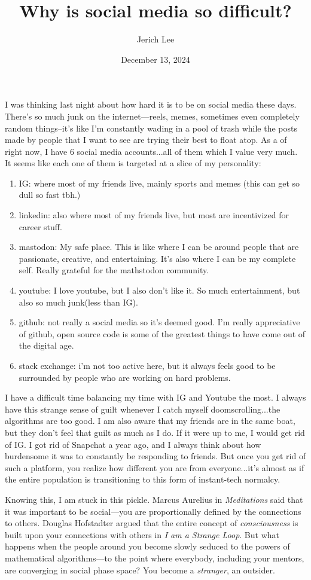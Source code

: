 \documentclass[12pt]{article}
\title{Why is social media so difficult?}
\author{Jerich Lee}
\date{December 13, 2024}
\theoremstyle{definition} %
\theoremstyle{plain} %
\begin{document}
\maketitle
I was thinking last night about how hard it is to be on social media these days. There's so much junk on the internet—reels, memes, sometimes even completely random things–it's like I'm constantly wading in a pool of trash while the posts made by people that I want to see are trying their best
to float atop. As a of right now, I have 6 social media accounts...all of them which I value very much. It seems like each one of them is targeted at a slice of my personality:
\begin{enumerate}
    \item IG: where most of my friends live, mainly sports and memes (this can get so dull so fast tbh.)
    \item linkedin: also where most of my friends live, but most are incentivized for career stuff.
    \item mastodon: My safe place. This is like where I can be around people that are passionate, creative, and entertaining. It's also where I can be my complete self. Really grateful for the mathstodon community.
    \item youtube: I love youtube, but I also don't like it. So much entertainment, but also so much junk(less than IG). 
    \item github: not really a social media so it's deemed good. I'm really appreciative of github, open source code is some of the greatest things to have come out of the digital age.
    \item stack exchange: i'm not too active here, but it always feels good to be surrounded by people who are working on hard problems.
\end{enumerate}
I have a difficult time balancing my time with IG and Youtube the most. I always have this strange sense of guilt whenever I catch myself doomscrolling...the algorithms are too good. I am also aware that my friends are in the same boat, but they don't feel that guilt as much as I do.
If it were up to me, I would get rid of IG. I got rid of Snapchat a year ago, and I always think about how burdensome it was to constantly be responding to friends. But once you get rid of such a platform, you realize how different you are from everyone...it's almost as if the entire population is transitioning to this form of instant-tech normalcy. 

Knowing this, I am stuck in this pickle. Marcus Aurelius in \emph{Meditations} said that it was important to be social—you are proportionally defined by the connections to others. Douglas Hofstadter argued that the entire concept of \emph{consciousness} is built upon your connections with others in \emph{I am a Strange Loop}. But what happens when the people around you become slowly seduced to the powers of mathematical algorithms—to the point where everybody, including your mentors, are converging in social phase space? You become a \emph{stranger}, an outsider. 
\end{document}
